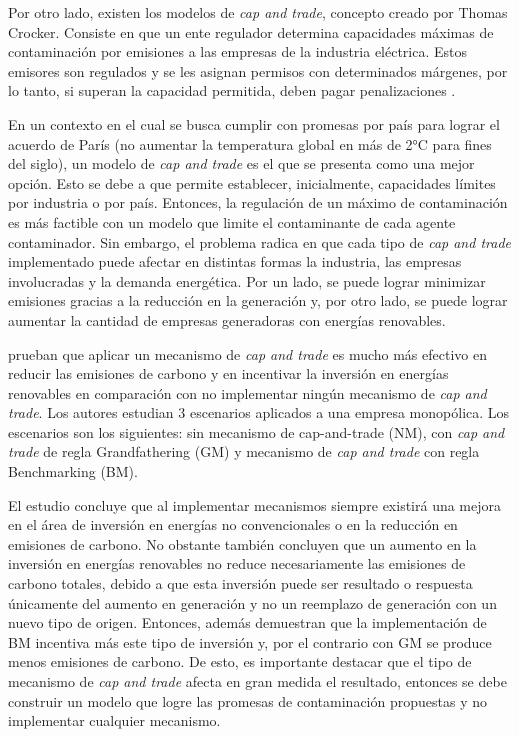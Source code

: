 Por otro lado, existen los modelos de \textit{cap and trade}, concepto creado por Thomas Crocker. Consiste en que un ente regulador determina capacidades máximas de contaminación por emisiones a las empresas de la industria eléctrica. Estos emisores son regulados y se les asignan permisos con determinados márgenes, por lo tanto, si superan la capacidad permitida, deben pagar penalizaciones . 
\vspace{2.5mm}

En un contexto en el cual se busca cumplir con promesas por país para lograr el acuerdo de París (no aumentar la temperatura global en más de 2°C para fines del siglo), un modelo de \textit{cap and trade} es el que se presenta como una mejor opción. Esto se debe a que permite establecer, inicialmente, capacidades límites por industria o por país. Entonces, la regulación de un máximo de contaminación es más factible con un modelo que limite el contaminante de cada agente contaminador. Sin embargo, el problema radica en que cada tipo de \textit{cap and trade} implementado puede afectar en distintas formas la industria, las empresas involucradas y la demanda energética. Por un lado, se puede lograr minimizar emisiones gracias a la reducción en la generación y, por otro lado, se puede lograr aumentar la cantidad de empresas generadoras con energías renovables.
\vspace{2.5mm}

 prueban que aplicar un mecanismo de \textit{cap and trade} es mucho más efectivo en reducir las emisiones de carbono y en incentivar la inversión en energías renovables en comparación con no implementar ningún mecanismo de \textit{cap and trade}. Los autores estudian 3 escenarios aplicados a una empresa monopólica. Los escenarios son los siguientes: sin mecanismo de cap-and-trade (NM), con \textit{cap and trade} de regla Grandfathering (GM) y mecanismo de \textit{cap and trade} con regla Benchmarking (BM). 
\vspace{2.5mm}

El estudio concluye que al implementar mecanismos siempre existirá una mejora en el área de inversión en energías no convencionales o en la reducción en emisiones de carbono. No obstante también concluyen que un aumento en la inversión en energías renovables no reduce necesariamente las emisiones de carbono totales, debido a que esta inversión puede ser resultado o respuesta únicamente del aumento en generación y no un reemplazo de generación con un nuevo tipo de origen. Entonces, además demuestran que la implementación de BM incentiva más este tipo de inversión y, por el contrario con GM se produce menos emisiones de carbono. De esto, es importante destacar que el tipo de mecanismo de \textit{cap and trade} afecta en gran medida el resultado, entonces se debe construir un modelo que logre las promesas de contaminación propuestas y no implementar cualquier mecanismo. 
\vspace{2.5mm}

